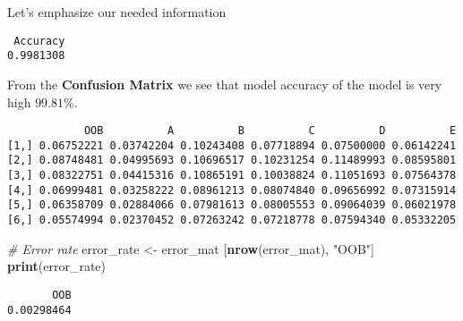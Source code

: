 \documentclass[
  10pt,
  a4paper]{article}
\newenvironment{Shaded}{\begin{snugshade}}{\end{snugshade}}
\newcommand{\CommentTok}[1]{\textcolor[rgb]{0.56,0.35,0.01}{\textit{#1}}}
\newcommand{\KeywordTok}[1]{\textcolor[rgb]{0.13,0.29,0.53}{\textbf{#1}}}
\newcommand{\NormalTok}[1]{#1}
\newcommand{\OperatorTok}[1]{\textcolor[rgb]{0.81,0.36,0.00}{\textbf{#1}}}
\newcommand{\StringTok}[1]{\textcolor[rgb]{0.31,0.60,0.02}{#1}}
\begin{document}
Let's emphasize our needed information

\begin{Shaded}
\end{Shaded}

\begin{verbatim}
 Accuracy 
0.9981308 
\end{verbatim}

From the \textbf{Confusion Matrix} we see that model accuracy of the
model is very high \(99.81 \%\).

\begin{Shaded}
\end{Shaded}

\begin{verbatim}
            OOB          A          B          C          D          E
[1,] 0.06752221 0.03742204 0.10243408 0.07718894 0.07500000 0.06142241
[2,] 0.08748481 0.04995693 0.10696517 0.10231254 0.11489993 0.08595801
[3,] 0.08322751 0.04415316 0.10865191 0.10038824 0.11051693 0.07564378
[4,] 0.06999481 0.03258222 0.08961213 0.08074840 0.09656992 0.07315914
[5,] 0.06358709 0.02884066 0.07981613 0.08005553 0.09064039 0.06021978
[6,] 0.05574994 0.02370452 0.07263242 0.07218778 0.07594340 0.05332205
\end{verbatim}

\begin{Shaded}
\begin{Highlighting}[]
\CommentTok{# Error rate}
\NormalTok{error_rate <-}\StringTok{ }\NormalTok{error_mat [}\KeywordTok{nrow}\NormalTok{(error_mat), }\StringTok{"OOB"}\NormalTok{]}
\KeywordTok{print}\NormalTok{(error_rate)}
\end{Highlighting}
\end{Shaded}

\begin{verbatim}
       OOB 
0.00298464 
\end{verbatim}
\end{document}
